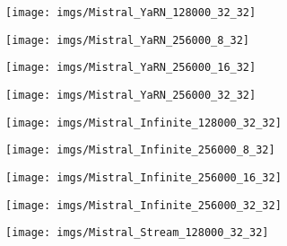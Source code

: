 \begin{figure*}[ht]
\begin{minipage}{\textwidth}
		\centering
		\begin{minipage}{0.24\textwidth}
			\centering
			\texttt{[image: imgs/Mistral\_YaRN\_128000\_32\_32]} %
		\end{minipage}%
		\begin{minipage}{0.24\textwidth}
			\centering
			\texttt{[image: imgs/Mistral\_YaRN\_256000\_8\_32]} %
		\end{minipage}%
		\begin{minipage}{0.24\textwidth}
			\centering
			\texttt{[image: imgs/Mistral\_YaRN\_256000\_16\_32]} %
		\end{minipage}%
		\begin{minipage}{0.24\textwidth}
			\centering
			\texttt{[image: imgs/Mistral\_YaRN\_256000\_32\_32]} %
		\end{minipage}
	\end{minipage}
	\begin{minipage}{\textwidth}
		\centering
		\begin{minipage}{0.24\textwidth}
			\centering
			\texttt{[image: imgs/Mistral\_Infinite\_128000\_32\_32]} %
		\end{minipage}%
		\begin{minipage}{0.24\textwidth}
			\centering
			\texttt{[image: imgs/Mistral\_Infinite\_256000\_8\_32]} %
		\end{minipage}%
		\begin{minipage}{0.24\textwidth}
			\centering
			\texttt{[image: imgs/Mistral\_Infinite\_256000\_16\_32]} %
		\end{minipage}%
		\begin{minipage}{0.24\textwidth}
			\centering
			\texttt{[image: imgs/Mistral\_Infinite\_256000\_32\_32]} %
		\end{minipage}
	\end{minipage}
	\begin{minipage}{\textwidth}
		\centering
		\begin{minipage}{0.24\textwidth}
			\centering
			\texttt{[image: imgs/Mistral\_Stream\_128000\_32\_32]} %

\end{minipage}
\end{minipage}
\end{figure*}
